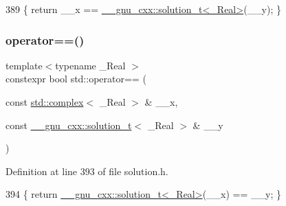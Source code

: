 \begin{DoxyCode}
389     \{ \textcolor{keywordflow}{return} \_\_x == \hyperlink{namespace____gnu__cxx_ae20ea642de50eb361074c62676b0159c}{\_\_gnu\_cxx::solution\_t<\_Real>}(\_\_y); \}
\end{DoxyCode}
\mbox{\label{namespacestd_a79924b566476ed02b0e085744a838d4c}} 
\subsubsection{\texorpdfstring{operator==()}{operator==()}\hspace{0.1cm}{\footnotesize\ttfamily [5/5]}}
{\footnotesize\ttfamily template$<$typename \+\_\+\+Real $>$ \\
constexpr bool std\+::operator== (\begin{DoxyParamCaption}\item[{const \hyperlink{classstd_1_1complex}{std\+::complex}$<$ \+\_\+\+Real $>$ \&}]{\+\_\+\+\_\+x,  }\item[{const \hyperlink{namespace____gnu__cxx_ae20ea642de50eb361074c62676b0159c}{\+\_\+\+\_\+gnu\+\_\+cxx\+::solution\+\_\+t}$<$ \+\_\+\+Real $>$ \&}]{\+\_\+\+\_\+y }\end{DoxyParamCaption})}



Definition at line 393 of file solution.\+h.


\begin{DoxyCode}
394     \{ \textcolor{keywordflow}{return} \hyperlink{namespace____gnu__cxx_ae20ea642de50eb361074c62676b0159c}{\_\_gnu\_cxx::solution\_t<\_Real>}(\_\_x) == \_\_y; \}
\end{DoxyCode}

